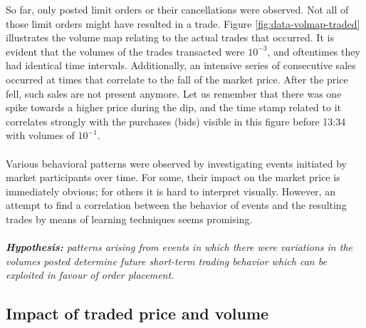 So far, only posted limit orders or their cancellations were observed.
Not all of those limit orders might have resulted in a trade. Figure \ref{fig:data-volmap-traded} illustrates the volume map relating to the actual trades that occurred.
It is evident that the volumes of the trades transacted were $10^{-3}$, and oftentimes they had identical time intervals.
Additionally, an intensive series of consecutive sales occurred at times that correlate to the fall of the market price.
After the price fell, such sales are not present anymore.
Let us remember that there was one spike towards a higher price during the dip, and the time stamp related to it correlates strongly with the purchases (bids) visible in this figure before 13:34 with volumes of $10^{-1}$.
\\
\\
Various behavioral patterns were observed by investigating events initiated by market participants over time.
For some, their impact on the market price is immediately obvious; for others it is hard to interpret visually.
However, an attempt to find a correlation between the behavior of events and the resulting trades by means of learning techniques seems promising.
\\
\\
\textit{\textbf{Hypothesis:} patterns arising from events in which there were variations in the volumes posted determine future short-term trading behavior which can be exploited in favour of order placement.}

\subsection{Impact of traded price and volume}
\label{sec:data-hypthesis-trade-price-volume}

